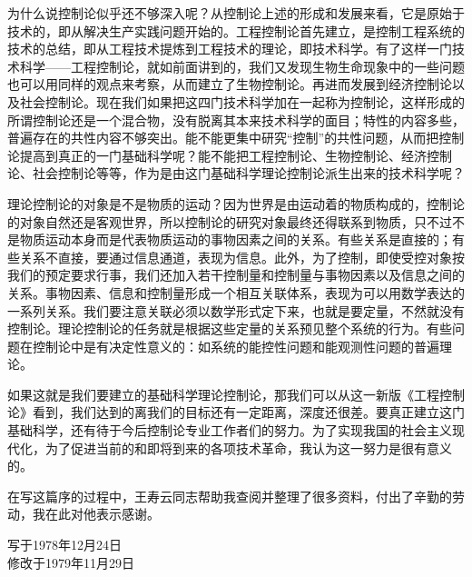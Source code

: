 为什么说控制论似乎还不够深入呢？从控制论上述的形成和发展来看，它是原始于技术的，即从解决生产实践问题开始的。工程控制论首先建立，是控制工程系统的技术的总结，即从工程技术提炼到工程技术的理论，即技术科学。有了这样一门技术科学——工程控制论，就如前面讲到的，我们又发现生物生命现象中的一些问题也可以用同样的观点来考察，从而建立了生物控制论。再进而发展到经济控制论以及社会控制论。现在我们如果把这四门技术科学加在一起称为控制论，这样形成的所谓控制论还是一个混合物，没有脱离其本来技术科学的面目；特性的内容多些，普遍存在的共性内容不够突出。能不能更集中研究“控制”的共性问题，从而把控制论提高到真正的一门基础科学呢？能不能把工程控制论、生物控制论、经济控制论、社会控制论等等，作为是由这门基础科学理论控制论派生出来的技术科学呢？

理论控制论的对象是不是物质的运动？因为世界是由运动着的物质构成的，控制论的对象自然还是客观世界，所以控制论的研究对象最终还得联系到物质，只不过不是物质运动本身而是代表物质运动的事物因素之间的关系。有些关系是直接的；有些关系不直接，要通过信息通道，表现为信息。此外，为了控制，即使受控对象按我们的预定要求行事，我们还加入若干控制量和控制量与事物因素以及信息之间的关系。事物因素、信息和控制量形成一个相互关联体系，表现为可以用数学表达的一系列关系。我们要注意关联必须以数学形式定下来，也就是要定量，不然就没有控制论。理论控制论的任务就是根据这些定量的关系预见整个系统的行为。有些问题在控制论中是有决定性意义的：如系统的能控性问题和能观测性问题的普遍理论。

如果这就是我们要建立的基础科学理论控制论，那我们可以从这一新版《工程控制论》看到，我们达到的离我们的目标还有一定距离，深度还很差。要真正建立这门基础科学，还有待于今后控制论专业工作者们的努力。为了实现我国的社会主义现代化，为了促进当前的和即将到来的各项技术革命，我认为这一努力是很有意义的。

在写这篇序的过程中，王寿云同志帮助我查阅并整理了很多资料，付出了辛勤的劳动，我在此对他表示感谢。

\begin{flushright}
写于1978年12月24日\\
修改于1979年11月29日
\end{flushright}